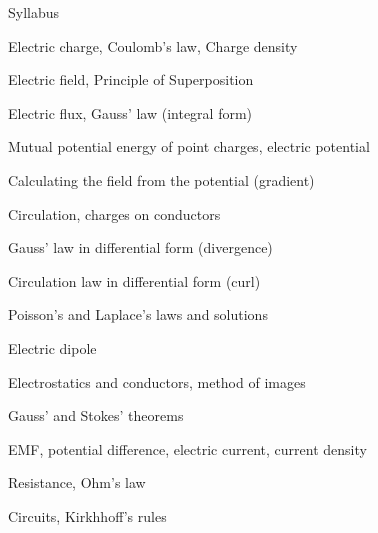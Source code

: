 \begin{frame}{Syllabus}

\begin{itemize}
{\small
\item
Electric charge, Coulomb’s law, Charge density
\item
Electric field, Principle of Superposition
\item
Electric flux, Gauss’ law (integral form)
\item
Mutual potential energy of point charges, electric potential
\item
Calculating the field from the potential (gradient)
\item
Circulation, charges on conductors
\item
Gauss’ law in differential form (divergence)
\item
Circulation law in differential form (curl)
\item
Poisson’s and Laplace’s laws and solutions
\item
Electric dipole
\item
Electrostatics and conductors, method of images
\item
Gauss’ and Stokes’ theorems
\item
EMF, potential difference, electric current, current density
\item
Resistance, Ohm’s law
\item
Circuits, Kirkhhoff’s rules
}
\end{itemize}

\end{frame}


